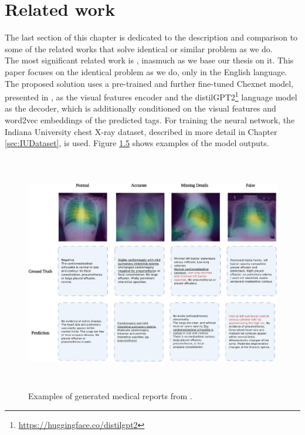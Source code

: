 \section{Related work}
\label{sec:RelatedWork}
The last section of this chapter is dedicated to the description and comparison to some of the related works that solve identical or similar problem as we do.\\

The most significant related work is \citet{alfarghaly2021automated}, inasmuch as we base our thesis on it. This paper focuses on the identical problem as we do, only in the English language. The proposed solution uses a pre-trained and further fine-tuned Chexnet model, presented in \citet{rajpurkar2017chexnet}, as the visual features encoder and the distilGPT2\footnote[14]{\url{https://huggingface.co/distilgpt2}} language model\citep{sanh2019distilbert} as the decoder, which is additionally conditioned on the visual features and word2vec\citep{mikolov2013distributed} embeddings of the predicted tags. For training the neural network, the Indiana University chest X-ray dataset, described in more detail in Chapter \ref{sec:IUDataset}, is used. Figure \hyperref[fig05:OmarExample]{1.5} shows examples of the model outputs.\\

\begin{figure}[h]\centering
\includegraphics[width=145mm, height=104mm]{../img/OmarExample}
\caption{Examples of generated medical reports from \citet{alfarghaly2021automated}.}
\label{fig05:OmarExample}
\end{figure}

